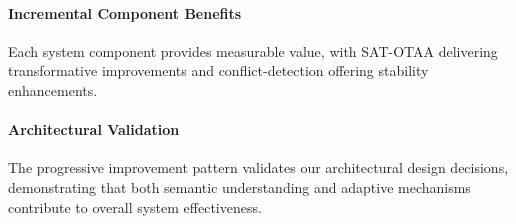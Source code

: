 \paragraph{Incremental Component Benefits} Each system component provides measurable value, with SAT-OTAA delivering transformative improvements and conflict-detection offering stability enhancements.

\paragraph{Architectural Validation} The progressive improvement pattern validates our architectural design decisions, demonstrating that both semantic understanding and adaptive mechanisms contribute to overall system effectiveness.
